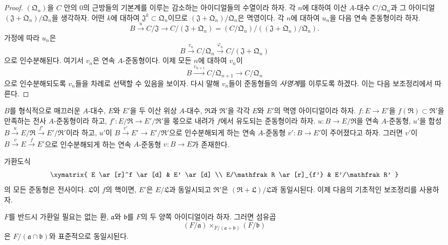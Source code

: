 \begin{proof}
$(\mathfrak Q_n)$을 $C$ 안의 $0$의 근방들의 기본계를 이루는 감소하는
아이디얼들의 수열이라 하자. 각 $n$에 대하여 이산 $A$-대수
$C/\mathfrak Q_n$과 그 아이디얼
$(\mathfrak J+\mathfrak Q_n)/\mathfrak Q_n$을 생각하자. 어떤 $k$에
대하여 $\mathfrak J^k\subset\mathfrak Q_n$이므로
$(\mathfrak J+\mathfrak Q_n)/\mathfrak Q_n$은 멱영이다. 각 $n$에
대하여 $u_n$을 다음 연속 준동형이라 하자.
\[
  B\xrightarrow{u}C/\mathfrak J\to C/(\mathfrak J+\mathfrak Q_n)
  =(C/\mathfrak Q_n)/((\mathfrak J+\mathfrak Q_n)/\mathfrak Q_n).
\]
가정에 따라 $u_n$은
\[
  B\xrightarrow{v_n}C/\mathfrak Q_n
  \xrightarrow{\varphi_n}C/(\mathfrak J+\mathfrak Q_n)
\]
으로 인수분해된다. 여기서 $v_n$은 연속 $A$-준동형이다. 이제 모든
$n$에 대하여 $v_n$이
\[
  B\xrightarrow{v_{n+1}}C/\mathfrak Q_{n+1}\to C/\mathfrak Q_n
\]
으로 인수분해되도록 $v_n$들을 차례로 선택할 수 있음을 보이자. 다시
말해 $v_n$들이 준동형들의 \emph{사영계}를 이루도록 하겠다. 이는 다음
보조정리에서 따른다.
\end{proof}

\begin{lemma}[19.3.10.1]
\label{0.19.3.10.1-fr}
$B$를 형식적으로 매끄러운 $A$-대수, $E$와 $E'$을 두 이산 위상
$A$-대수, $\mathfrak R$과 $\mathfrak R'$을 각각 $E$와 $E'$의 멱영
아이디얼이라 하자. $f:E\to E'$을
$f(\mathfrak R)\subset\mathfrak R'$을 만족하는 전사
$A$-준동형이라 하고,
$f':E/\mathfrak R\to E'/\mathfrak R'$을 몫으로 내려가 $f$에서
유도되는 준동형이라 하자. $u:B\to E/\mathfrak R$을 연속
$A$-준동형, $u'$을 합성
$B\xrightarrow{u}E/\mathfrak R\xrightarrow{f'}E'/\mathfrak R'$이라
하고, $u'$이 $B\xrightarrow{v'}E'\to E'/\mathfrak R'$으로
인수분해되게 하는 연속 $A$-준동형 $v':B\to E'$이 주어졌다고 하자.
그러면 $v'$이 $B\xrightarrow{v}E\xrightarrow{f}E'$으로
인수분해되게 하는 연속 $A$-준동형 $v:B\to E$가 존재한다.
\end{lemma}

가환도식
\[
\xymatrix{
  E \ar[r]^f \ar[d] & E' \ar[d] \\
  E/\mathfrak R \ar[r]_{f'} & E'/\mathfrak R'
}
\]
의 모든 준동형은 전사이다. $\mathfrak L$이 $f$의 핵이면, $E'$은
$E/\mathfrak L$과 동일시되고 $\mathfrak R'$은
$(\mathfrak R+\mathfrak L)/\mathfrak L$과 동일시된다. 이제 다음의
기초적인 보조정리를 사용하자.

\begin{lemma}[19.3.10.2]
\label{0.19.3.10.2-fr}
$F$를 반드시 가환일 필요는 없는 환, $\mathfrak a$와 $\mathfrak b$를
$F$의 두 양쪽 아이디얼이라 하자. 그러면 섬유곱
\[
  (F/\mathfrak a)\times_{F/(\mathfrak a+\mathfrak b)}(F/\mathfrak b)
\]
은 $F/(\mathfrak a\cap\mathfrak b)$와 표준적으로 동일시된다.
\end{lemma}

